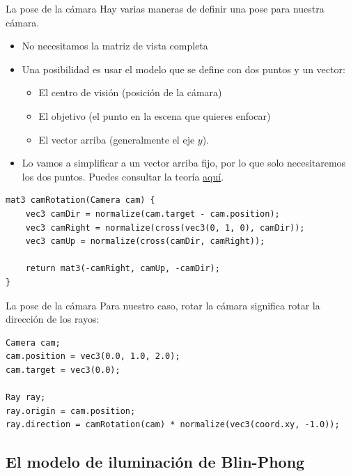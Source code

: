 \begin{frame}[fragile]{La pose de la cámara}
Hay varias maneras de definir una pose para nuestra cámara.
\begin{itemize}
    \item No necesitamos la matriz de vista completa
    \item Una posibilidad es usar el modelo  que se define con dos puntos y un vector:
    \begin{itemize}
        \item El centro de visión (posición de la cámara)
        \item El objetivo (el punto en la escena que quieres enfocar)
        \item El vector arriba (generalmente el eje $y$).
    \end{itemize}
    \item Lo vamos a simplificar a un vector arriba fijo, por lo que solo necesitaremos los dos puntos. Puedes consultar la teoría \href{https://learnopengl.com/Getting-started/Camera}{aquí}.
\end{itemize}
\begin{listing}
\begin{verbatim}
mat3 camRotation(Camera cam) {
    vec3 camDir = normalize(cam.target - cam.position);
    vec3 camRight = normalize(cross(vec3(0, 1, 0), camDir));
    vec3 camUp = normalize(cross(camDir, camRight));

    return mat3(-camRight, camUp, -camDir);
}
\end{verbatim}
\end{listing}
\end{frame}

\begin{frame}[fragile]{La pose de la cámara}
Para nuestro caso, rotar la cámara significa rotar la dirección de los rayos:
\begin{listing}
\begin{verbatim}
Camera cam;
cam.position = vec3(0.0, 1.0, 2.0);
cam.target = vec3(0.0);

Ray ray;
ray.origin = cam.position;
ray.direction = camRotation(cam) * normalize(vec3(coord.xy, -1.0));
\end{verbatim}
\end{listing}
\end{frame}

\subsection{El modelo de iluminación de Blin-Phong}

